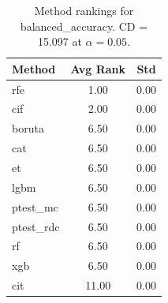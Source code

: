 \begin{table}[h]
\centering
\caption{Method rankings for balanced_accuracy. CD = 15.097 at $\alpha=0.05$.}
\label{tab:ranks_balanced_accuracy}
\begin{tabular}{lcc}
\toprule
Method & Avg Rank & Std \\
\midrule
rfe & 1.00 & 0.00 \\
cif & 2.00 & 0.00 \\
boruta & 6.50 & 0.00 \\
cat & 6.50 & 0.00 \\
et & 6.50 & 0.00 \\
lgbm & 6.50 & 0.00 \\
ptest_mc & 6.50 & 0.00 \\
ptest_rdc & 6.50 & 0.00 \\
rf & 6.50 & 0.00 \\
xgb & 6.50 & 0.00 \\
cit & 11.00 & 0.00 \\
\bottomrule
\end{tabular}
\end{table}